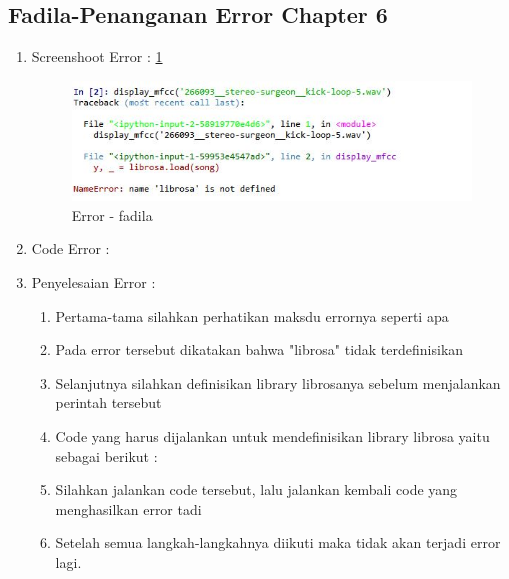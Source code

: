 \subsection{ Fadila-Penanganan Error Chapter 6}
\begin{enumerate}
\item Screenshoot Error : \ref{chapter-6-error-1-fadila}
\par
\begin{figure}[!hbtp]
\centering
\includegraphics[scale=0.2]{figures/chapter-6-error-1-fadila.jpg}
\caption{Error - fadila}
\label{chapter-6-error-1-fadila}
\end{figure}
\par
\par
\item Code Error :
\par

\par
\item Penyelesaian Error :
\begin{enumerate}
\item Pertama-tama silahkan perhatikan maksdu errornya seperti apa
\item Pada error tersebut dikatakan bahwa "librosa" tidak terdefinisikan
\item Selanjutnya silahkan definisikan library librosanya sebelum menjalankan perintah tersebut
\item Code yang harus dijalankan untuk mendefinisikan library librosa yaitu sebagai berikut :
\par

\par
\item Silahkan jalankan code tersebut, lalu jalankan kembali code yang menghasilkan error tadi
\item Setelah semua langkah-langkahnya diikuti maka tidak akan terjadi error lagi.
\end{enumerate}
\end{enumerate}
















